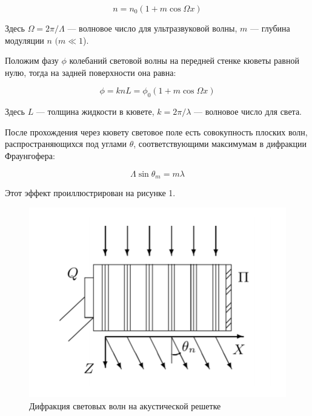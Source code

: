 \documentclass{article}
\begin{document}
	\begin{equation}\label{}
	n = n_0 (1 + m \cos \Omega x)
	\end{equation}
	
	Здесь $ \Omega = 2 \pi / \Lambda $ --- волновое число для ультразвуковой волны, $ m $ --- глубина модуляции $ n $ $ (m \ll 1 $).
	
	Положим фазу $ \phi $ колебаний световой волны на передней стенке кюветы равной нулю, тогда на задней поверхности она равна:
	
	\begin{equation}\label{}
	\phi  = k n L = \phi_0 (1 + m \cos \Omega x)
	\end{equation}
	
	Здесь $ L $ --- толщина жидкости в кювете, $ k = 2 \pi / \lambda $ --- волновое число для света.
	
	После прохождения через кювету световое поле есть совокупность плоских волн, распространяющихся под углами $ \theta $, соответствующими максимумам в дифракции Фраунгофера:
	
\begin{equation}\label{}	
	\Lambda \sin \theta_m = m \lambda
\end{equation}

	Этот эффект проиллюстрирован на рисунке 1.



 \begin{figure}[h!]
	\includegraphics[scale=0.23]{wave.png}
	\centering
	\caption{Дифракция световых волн на акустической решетке}
\end{figure}
\end{document}
